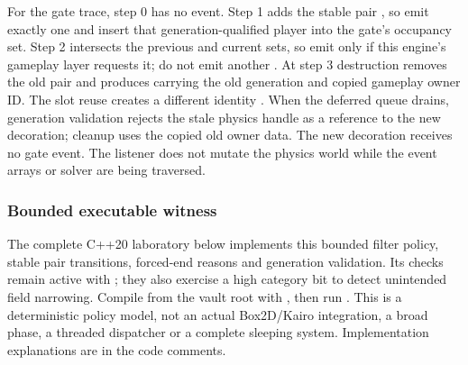 For the gate trace, step 0 has no event. Step 1 adds the stable pair , so emit exactly one  and insert that generation-qualified player into the gate's occupancy set. Step 2 intersects the previous and current sets, so emit  only if this engine's gameplay layer requests it; do not emit another . At step 3 destruction removes the old pair and produces  carrying the old generation and copied gameplay owner ID. The slot reuse creates a different identity . When the deferred queue drains, generation validation rejects the stale physics handle as a reference to the new decoration; cleanup uses the copied old owner data. The new decoration receives no gate event. The listener does not mutate the physics world while the event arrays or solver are being traversed.

\subsubsection{Bounded executable witness}\label{05-engine-i-ch017-bounded-executable-witness}

\hypertarget{05-engine-i-ch017-bounded-executable-witness}{}

The complete C++20 laboratory below implements this bounded filter policy, stable pair transitions, forced-end reasons and generation validation. Its checks remain active with ; they also exercise a high category bit to detect unintended field narrowing. Compile from the vault root with , then run . This is a deterministic policy model, not an actual Box2D/Kairo integration, a broad phase, a threaded dispatcher or a complete sleeping system. Implementation explanations are in the code comments.

